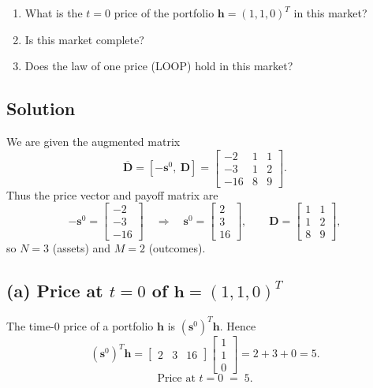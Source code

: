 \documentclass{article}
\begin{document}
\begin{enumerate}
\item[(a)] What is the $t=0$ price of the portfolio $\mathbf{h}=(1,1,0)^{T}$ in this market?
\item[(b)] Is this market complete?
\item[(c)] Does the law of one price (LOOP) hold in this market?
\end{enumerate}
\bigskip

\subsection*{Solution}

We are given the augmented matrix
\[
\overline{\mathbf D}=[-\mathbf s^0,\ \mathbf D]
=
\begin{bmatrix}
-2 & 1 & 1\\[4pt]
-3 & 1 & 2\\[4pt]
-16 & 8 & 9
\end{bmatrix}.
\]
Thus the price vector and payoff matrix are
\[
-\mathbf s^0=\begin{bmatrix}-2\\-3\\-16\end{bmatrix}
\quad\Longrightarrow\quad
\mathbf s^0=\begin{bmatrix}2\\3\\16\end{bmatrix},
\qquad
\mathbf D=\begin{bmatrix}
1 & 1\\[4pt]
1 & 2\\[4pt]
8 & 9
\end{bmatrix},
\]
so \(N=3\) (assets) and \(M=2\) (outcomes).

\subsection*{(a) Price at \(t=0\) of \(\mathbf h=(1,1,0)^T\)}
The time-0 price of a portfolio \(\mathbf h\) is \((\mathbf s^0)^T\mathbf h\). Hence
\[
(\mathbf s^0)^T\mathbf h
=
\begin{bmatrix}2&3&16\end{bmatrix}
\begin{bmatrix}1\\1\\0\end{bmatrix}
=2+3+0=5.
\]
\[
\boxed{\text{Price at }t=0 \;=\; 5.}
\]
\end{document}
